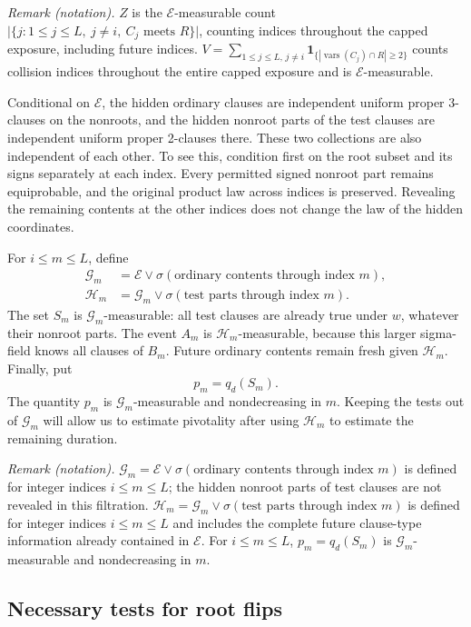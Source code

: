 \documentclass[11pt]{article}
\theoremstyle{remark}
\newcommand{\ind}{\mathbf 1}
\newcommand{\cE}{\mathcal E}
\newcommand{\cG}{\mathcal G}
\newcommand{\cH}{\mathcal H}
\numberwithin{equation}{section}
\begin{document}
\noindent\textit{Remark (notation).} $Z$ is the $\cE$-measurable count $\bigl|\{j:1\le j\le L,\ j\ne i,\ C_j\text{ meets }R\}\bigr|$, counting indices throughout the capped exposure, including future indices. $V=\sum_{1\le j\le L,\,j\ne i}\ind_{\{|\operatorname{vars}(C_j)\cap R|\ge2\}}$ counts collision indices throughout the entire capped exposure and is $\cE$-measurable.


Conditional on $\cE$, the hidden ordinary clauses are independent uniform
proper 3-clauses on the nonroots, and the hidden nonroot parts of the
test clauses are independent uniform proper 2-clauses there.
These two collections are also independent of each other.
To see this, condition first on the root subset and its signs separately
at each index. Every permitted signed nonroot part remains equiprobable,
and the original product law across indices is preserved. Revealing
the remaining contents at the other indices does not change the law
of the hidden coordinates.

For $i\le m\le L$, define
\begin{align*}
 \cG_m&=\cE\vee\sigma(\text{ordinary contents through index }m),\\
 \cH_m&=\cG_m\vee\sigma(\text{test parts through index }m).
\end{align*}
The set $S_m$ is $\cG_m$-measurable: all test clauses are already true
under $w$, whatever their nonroot parts. The event $A_m$ is
$\cH_m$-measurable, because this larger sigma-field knows all clauses
of $B_m$. Future ordinary contents remain fresh given $\cH_m$.
Finally, put
\begin{equation}
 p_m=q_d(S_m).
 \label{eq:p}
\end{equation}
The quantity $p_m$ is $\cG_m$-measurable and nondecreasing in $m$.
Keeping the tests out of $\cG_m$ will allow us to estimate pivotality
after using $\cH_m$ to estimate the remaining duration.

\noindent\textit{Remark (notation).} $\cG_m=\cE\vee\sigma(\text{ordinary contents through index }m)$ is defined for integer indices $i\le m\le L$; the hidden nonroot parts of test clauses are not revealed in this filtration. $\cH_m=\cG_m\vee\sigma(\text{test parts through index }m)$ is defined for integer indices $i\le m\le L$ and includes the complete future clause-type information already contained in $\cE$. For $i\le m\le L$, $p_m=q_d(S_m)$ is $\cG_m$-measurable and nondecreasing in $m$.


\subsection{Necessary tests for root flips}
\end{document}
